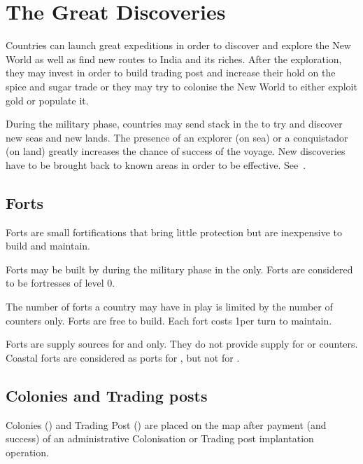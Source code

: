 \section{The Great Discoveries}

Countries can launch great expeditions in order to discover and explore the
New World as well as find new routes to India and its riches. After the
exploration, they may invest in order to build trading post and increase their
hold on the spice and sugar trade or they may try to colonise the New World to
either exploit gold or populate it.

\aparag[Exploration] During the military phase, countries may send stack in
the \ROTW to try and discover new seas and new lands.
\bparag The presence of an explorer (on sea) or a conquistador (on land)
greatly increases the chance of success of the voyage.
\bparag New discoveries have to be brought back to known areas in order to be
effective.
\bparag See~.



\subsection{Forts}

Forts are small fortifications that bring little protection but are
inexpensive to build and maintain.

 Forts may be built by \LD during the military phase in
the \ROTW only.
\bparag Forts are considered to be fortresses of level 0.

 The number of forts a country may have in play is
limited by the number of counters only.
\bparag Forts are free to build.
\bparag Each fort costs 1\ducats per turn to maintain.

 Forts are supply sources for \LD and \ND only. They
do not provide supply for \ARMY or \FLEET counters.
\bparag Coastal forts are considered as ports for \ND, but not for \FLEET.



\subsection{Colonies and Trading posts}

\label{chTime:COL TP}
Colonies (\COL) and Trading Post (\TP) are placed on the map after payment
(and success) of an administrative Colonisation or Trading post implantation
operation.

